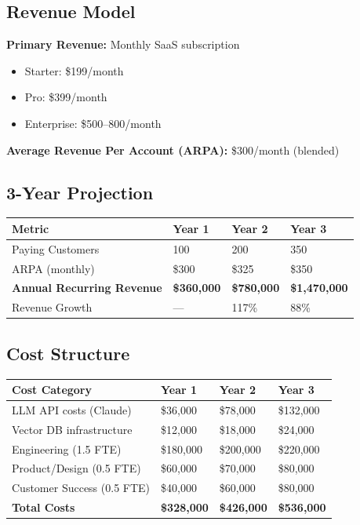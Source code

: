 \documentclass[11pt,a4paper]{article}
\begin{document}
\subsection{Revenue Model}

\textbf{Primary Revenue:} Monthly SaaS subscription
\begin{itemize}[leftmargin=*]
    \item Starter: \$199/month
    \item Pro: \$399/month
    \item Enterprise: \$500--800/month
\end{itemize}

\textbf{Average Revenue Per Account (ARPA):} \$300/month (blended)

\subsection{3-Year Projection}

\begin{table}[H]
\centering
\begin{tabularx}{\textwidth}{@{}L{5cm}C{3.5cm}C{3.5cm}C{3.5cm}@{}}
\toprule
\textbf{Metric} & \textbf{Year 1} & \textbf{Year 2} & \textbf{Year 3} \\
\midrule
Paying Customers & 100 & 200 & 350 \\
ARPA (monthly) & \$300 & \$325 & \$350 \\
\textbf{Annual Recurring Revenue} & \textbf{\$360,000} & \textbf{\$780,000} & \textbf{\$1,470,000} \\
Revenue Growth & --- & 117\% & 88\% \\
\bottomrule
\end{tabularx}
\end{table}

\subsection{Cost Structure}

\begin{table}[H]
\centering
\begin{tabularx}{\textwidth}{@{}L{5cm}C{3.5cm}C{3.5cm}C{3.5cm}@{}}
\toprule
\textbf{Cost Category} & \textbf{Year 1} & \textbf{Year 2} & \textbf{Year 3} \\
\midrule
LLM API costs (Claude) & \$36,000 & \$78,000 & \$132,000 \\
Vector DB infrastructure & \$12,000 & \$18,000 & \$24,000 \\
Engineering (1.5 FTE) & \$180,000 & \$200,000 & \$220,000 \\
Product/Design (0.5 FTE) & \$60,000 & \$70,000 & \$80,000 \\
Customer Success (0.5 FTE) & \$40,000 & \$60,000 & \$80,000 \\
\midrule
\textbf{Total Costs} & \textbf{\$328,000} & \textbf{\$426,000} & \textbf{\$536,000} \\
\bottomrule
\end{tabularx}
\end{table}
\end{document}
